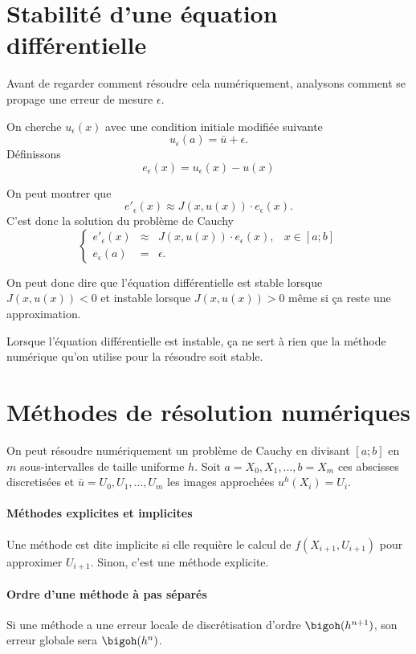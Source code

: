 \section{Stabilité d'une équation différentielle}
Avant de regarder comment résoudre cela numériquement,
analysons comment se propage une erreur de mesure $\epsilon$.

On cherche $u_\epsilon(x)$ avec une condition initiale modifiée suivante
\[ u_\epsilon(a) = \bar{u} + \epsilon. \]
Définissons
\[ e_\epsilon(x) = u_\epsilon(x) - u(x) \]

On peut montrer que
\[ e'_\epsilon(x) \approx J(x, u(x))\cdot e_\epsilon(x). \]
C'est donc la solution du problème de Cauchy
\[ \left\{ \begin{array}{rclr}
    e'_\epsilon(x) & \approx & J(x, u(x)) \cdot e_\epsilon(x), & x \in [a;b]\\
    e_\epsilon(a) & = & \epsilon.
\end{array} \right. \]

On peut donc dire que l'équation différentielle est stable lorsque
$J(x, u(x)) < 0$ et instable lorsque $J(x, u(x)) > 0$
même si ça reste une approximation.

Lorsque l'équation différentielle est instable, ça ne sert à rien
que la méthode numérique qu'on utilise pour la résoudre soit stable.

\section{Méthodes de résolution numériques}
On peut résoudre numériquement un problème de Cauchy en divisant
$[a;b]$ en $m$ sous-intervalles de taille uniforme $h$.
Soit $a = X_0, X_1, \ldots, b = X_m$ ces abscisses discretisées et
$\bar{u} = U_0, U_1, \ldots, U_m$ les images approchées $u^h(X_i) = U_i$.

\paragraph{Méthodes explicites et implicites}
Une méthode est dite implicite si elle requière le calcul de
$f(X_{i+1},U_{i+1})$ pour approximer $U_{i+1}$.
Sinon, c'est une méthode explicite.

\paragraph{Ordre d'une méthode à pas séparés}
Si une méthode a une erreur locale de discrétisation d'ordre
$\bigoh(h^{n+1})$, son erreur globale sera $\bigoh(h^n)$.

